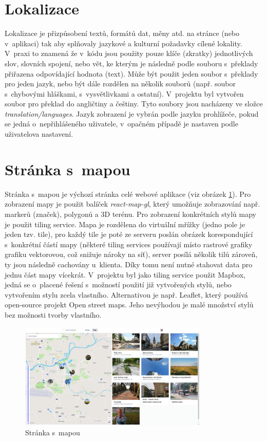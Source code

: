 \documentclass[12pt, a4paper,
  oneside,      %
]{report}
\begin{document}
\section{Lokalizace}
Lokalizace je přizpůsobení textů, formátů dat, měny atd. na stránce (nebo v~aplikaci) tak aby splňovaly jazykové a kulturní požadavky cílené lokality. V~praxi to znamená že v~kódu jsou použity pouze klíče (zkratky) jednotlivých slov, slovních spojení, nebo vět, ke kterým je následně podle souboru s~překlady přiřazena odpovídající hodnota (text). Může být použit jeden soubor s~překlady pro jeden jazyk, nebo být dále rozdělen na několik souborů (např. soubor s~chybovými hláškami, s~vysvětlivkami a ostatní). V~projektu byl vytvořen soubor pro překlad do angličtiny a češtiny. Tyto soubory jsou nacházeny ve složce \textit{translation/languages}. Jazyk zobrazení je vybrán podle jazyku prohlížeče, pokud se jedná o~nepřihlášeného uživatele, v~opačném případě je nastaven podle uživatelova nastavení. \cite{internationalizationVsLocalization}


\section{Stránka s~mapou}
Stránka s~mapou je výchozí stránka celé webové aplikace (viz obrázek \ref{figure:mapPagePreview}). Pro zobrazení mapy je použit balíček \textit{react-map-gl}, který umožňuje zobrazování např. markerů (značek), polygonů a 3D terénu. Pro zobrazení konkrétních stylů mapy je použit tiling service. Mapa je rozdělena do virtuální mřížky (jedno pole je jeden tzv. tile), pro každý tile je poté ze serveru poslán obrázek korespondující s~konkrétní částí mapy (některé tiling services používají místo rastrové grafiky grafiku vektorovou, což snižuje nároky na síť), server posílá několik tilů zároveň, ty jsou následně cachovány u~klienta. Díky tomu není nutné stahovat data pro jednu část mapy vícekrát. V~projektu byl jako tiling service použit Mapbox, jedná se o~placené řešení s~možností použití již vytvořených stylů, nebo vytvořením stylu zcela vlastního. Alternativou je např. Leaflet, který používá open-source projekt Open street maps. Jeho nevýhodou je malé množství stylů bez možnosti tvorby vlastního.

\begin{figure}[h]
	\centering
	\includegraphics[width=0.8\textwidth]{images/map_page.png}
	\caption{Stránka s~mapou}\label{figure:mapPagePreview}
\end{figure}
\end{document}
